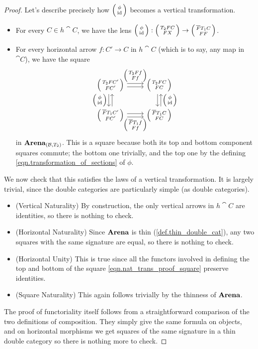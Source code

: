 \documentclass[DynamicalBook]{subfiles}
\begin{document}
\begin{proof}
Let's describe precisely how $\lens{\phi}{\id}$ becomes a vertical
transformation.
\begin{itemize}
  \item For every $C \in h\cat{C}$, we have the lens $\lens{\phi}{\id} :
    \lens{T_2 FC}{F X}  \to \lens{\overline{F}T_1 C}{F F}$.
  \item For every horizontal arrow $f : C' \to C$ in $h\cat{C}$ (which is to
    say, any map in $\cat{C}$), we have the square
    \begin{equation}\label{eqn.nat_trans_proof_square}
  \begin{tikzcd}
    \lens{T_2FC'}{FC'} \ar[r, shift left, "{\lens{T_2 Ff}{Ff}}"] \ar[r, shift right] \ar[d, shift right,
    "{\lens{\phi}{\id}}"'] \ar[d, shift left, leftarrow] &
    \lens{T_2FC}{FC} \ar[d, shift left, leftarrow,
    "{\lens{\phi}{\id}}"] \ar[d, shift right]\\
    \lens{\overline{F}T_1 C'}{FC'} \ar[r, shift right, "{\lens{\overline{F}T_1f}{Ff}}"']
    \ar[r, shift left] & \lens{\overline{F}T_1C}{FC}
  \end{tikzcd}
  \end{equation}
in $\textbf{Arena}_{(\mathcal{B}, T_2)}$. This is a square because both its top and
bottom component squares commute; the bottom one trivially, and the top one by
the defining \cref{eqn.transformation_of_sections} of $\phi$.
\end{itemize}
We now check that this satisfies the laws of a vertical transformation. It is
largely trivial, since the double categories are particularly simple (as double categories).
\begin{itemize}
  \item (Vertical Naturality) By construction, the only vertical arrows in
    $h\cat{C}$ are identities, so there is nothing to check.
  \item (Horizontal Naturality) Since $\textbf{Arena}$ is thin
    (\cref{def.thin_double_cat}), any two squares with the same signature are
    equal, so there is nothing to check.
  \item (Horizontal Unity) This is true since all the functors involved in
    defining the top and bottom of the square \cref{eqn.nat_trans_proof_square}
    preserve identities.
  \item (Square Naturality) This again follows trivially by the thinness of $\textbf{Arena}$.
\end{itemize}

The proof of functoriality itself follows from a straightforward comparison of
the two definitions of composition. They simply give the same formula on
objects, and on horizontal morphisms we get squares of the same signature in a
thin double category so there is nothing more to check.
\end{proof}
\end{document}
